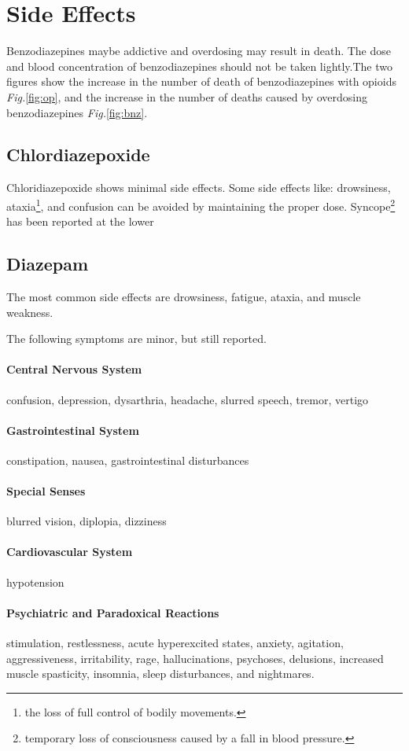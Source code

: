 \chapter{Side Effects}
Benzodiazepines maybe addictive and overdosing may result in death. The dose and blood concentration of benzodiazepines should not be taken lightly.The two figures show the increase in the number of death of benzodiazepines with opioids \emph{Fig.}\ref{fig:op}, and the increase in the number of deaths caused by overdosing benzodiazepines \emph{Fig.}\ref{fig:bnz}.\cite{death}
\section{Chlordiazepoxide}
Chloridiazepoxide shows minimal side effects. Some side effects like: drowsiness, ataxia\footnote{the loss of full control of bodily movements.}, and confusion can be avoided by maintaining the proper dose. Syncope\footnote{temporary loss of consciousness caused by a fall in blood pressure.} has been reported at the lower  

\section{Diazepam}
The most common side effects are drowsiness, fatigue, ataxia, and muscle weakness.

The following symptoms are minor, but still reported.
\subsubsection{Central Nervous System} confusion, depression, dysarthria, headache, slurred speech, tremor, vertigo

\subsubsection{Gastrointestinal System} constipation, nausea, gastrointestinal disturbances
\subsubsection{Special Senses} blurred vision, diplopia, dizziness
\subsubsection{Cardiovascular System} hypotension
\subsubsection{Psychiatric and Paradoxical Reactions} stimulation, restlessness, acute hyperexcited states, anxiety, agitation, aggressiveness, irritability, rage, hallucinations, psychoses, delusions, increased muscle spasticity, insomnia, sleep disturbances, and nightmares.
